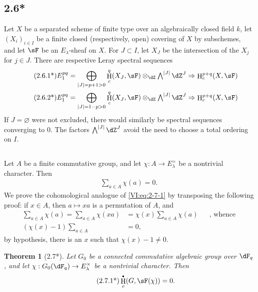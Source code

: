 \documentclass[12pt,oneside,english]{smfbook}
\DeclareMathOperator{\h}{H}
\newcounter{char}
\newtheorem*{theorem*}{Theorem}
\let\oldbullet\bullet
\renewcommand{\bullet}{\textnormal{\tiny$\oldbullet$}}
\begin{document}
\subsection*{2.6*}\label{VI:2-6*}

Let $X$ be a separated scheme of finite type over an algebraically closed field $k$, let $(X_i)_{i\in I}$ be a finite closed (respectively, open) covering of $X$ by subschemes, and let $\sF$ be an $E_\lambda$-sheaf on $X$. For $J\subset I$, let $X_J$ be the intersection of the $X_j$ for $j\in J$. There are respective Leray spectral sequences
\begin{align*}\tag{2.6.1*}\label{VI:eq:2-6-1*}
  E_1^{p q} &= \bigoplus_{|J|=p+1>0} \h_c^q(X_J,\sF) \otimes_\dZ \textstyle\bigwedge^{|J|} \dZ^J \Rightarrow \h_c^{p+q}(X,\sF) \\
  \tag{2.6.2*}\label{VI:eq:2-6-2*}
  E_1^{p q} &= \bigoplus_{|J|=1-p>0} \h_c^q(X_J,\sF) \otimes_\dZ \textstyle\bigwedge^{|J|} \dZ^J \Rightarrow \h_c^{p+q}(X,\sF)
\end{align*}
If $J=\varnothing$ were not excluded, there would similarly be spectral sequences converging to $0$. The factors $\bigwedge^{|J|}\dZ^J$ avoid the need to choose a total ordering on $I$.

\subsection{}\label{VI:2-7}

Let $A$ be a finite commutative group, and let $\chi:A\to E_\lambda^\times$ be a nontrivial character. Then
\begin{align*}\tag{2.7.1}\label{VI:eq:2-7-1}
  \sum_{a\in A} \chi(a) = 0 \text{.}
\end{align*}
We prove the cohomological analogue of \eqref{VI:eq:2-7-1} by transposing the following proof: if $x\in A$, then $a\mapsto xa$ is a permutation of $A$, and
\begin{align*}
  \sum_{a\in A}\chi(a) = \sum_{a\in A} \chi(x a)
    &= \chi(x) \sum_{a\in A} \chi(a) && \text{, whence} \\
  (\chi(x)-1)\sum_{a\in A} &= 0 \text{,}
\end{align*}
by hypothesis, there is an $x$ such that $\chi(x)-1\ne0$.

\begin{theorem*}[2.7*]\label{VI:2-7*}
Let $G_0$ be a connected commutative algebraic group over $\dF_q$, and let $\chi:G_0(\dF_q)\to E_\lambda^\times$ be a nontrivial character. Then
\begin{align*}\tag{2.7.1*}\label{VI:eq:2-7-1*}
  \h_c^\bullet(G,\sF(\chi)) = 0 \text{.}
\end{align*}
\end{theorem*}
\end{document}
